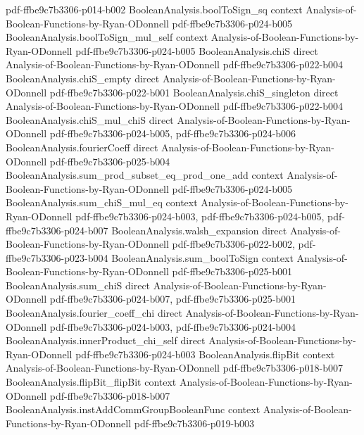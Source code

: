 \begin{theorem}
  {pdf-ffbe9c7b3306-p014-b002}
\proofstep
  {BooleanAnalysis.boolToSign_sq}
  {context}
  {Analysis-of-Boolean-Functions-by-Ryan-ODonnell}
  {pdf-ffbe9c7b3306-p024-b005}
\proofstep
  {BooleanAnalysis.boolToSign_mul_self}
  {context}
  {Analysis-of-Boolean-Functions-by-Ryan-ODonnell}
  {pdf-ffbe9c7b3306-p024-b005}
\proofstep
  {BooleanAnalysis.chiS}
  {direct}
  {Analysis-of-Boolean-Functions-by-Ryan-ODonnell}
  {pdf-ffbe9c7b3306-p022-b004}
\proofstep
  {BooleanAnalysis.chiS_empty}
  {direct}
  {Analysis-of-Boolean-Functions-by-Ryan-ODonnell}
  {pdf-ffbe9c7b3306-p022-b001}
\proofstep
  {BooleanAnalysis.chiS_singleton}
  {direct}
  {Analysis-of-Boolean-Functions-by-Ryan-ODonnell}
  {pdf-ffbe9c7b3306-p022-b004}
\proofstep
  {BooleanAnalysis.chiS_mul_chiS}
  {direct}
  {Analysis-of-Boolean-Functions-by-Ryan-ODonnell}
  {pdf-ffbe9c7b3306-p024-b005,
    pdf-ffbe9c7b3306-p024-b006}
\proofstep
  {BooleanAnalysis.fourierCoeff}
  {direct}
  {Analysis-of-Boolean-Functions-by-Ryan-ODonnell}
  {pdf-ffbe9c7b3306-p025-b004}
\proofstep
  {BooleanAnalysis.sum_prod_subset_eq_prod_one_add}
  {context}
  {Analysis-of-Boolean-Functions-by-Ryan-ODonnell}
  {pdf-ffbe9c7b3306-p024-b005}
\proofstep
  {BooleanAnalysis.sum_chiS_mul_eq}
  {context}
  {Analysis-of-Boolean-Functions-by-Ryan-ODonnell}
  {pdf-ffbe9c7b3306-p024-b003,
    pdf-ffbe9c7b3306-p024-b005,
    pdf-ffbe9c7b3306-p024-b007}
\proofstep
  {BooleanAnalysis.walsh_expansion}
  {direct}
  {Analysis-of-Boolean-Functions-by-Ryan-ODonnell}
  {pdf-ffbe9c7b3306-p022-b002,
    pdf-ffbe9c7b3306-p023-b004}
\proofstep
  {BooleanAnalysis.sum_boolToSign}
  {context}
  {Analysis-of-Boolean-Functions-by-Ryan-ODonnell}
  {pdf-ffbe9c7b3306-p025-b001}
\proofstep
  {BooleanAnalysis.sum_chiS}
  {direct}
  {Analysis-of-Boolean-Functions-by-Ryan-ODonnell}
  {pdf-ffbe9c7b3306-p024-b007,
    pdf-ffbe9c7b3306-p025-b001}
\proofstep
  {BooleanAnalysis.fourier_coeff_chi}
  {direct}
  {Analysis-of-Boolean-Functions-by-Ryan-ODonnell}
  {pdf-ffbe9c7b3306-p024-b003,
    pdf-ffbe9c7b3306-p024-b004}
\proofstep
  {BooleanAnalysis.innerProduct_chi_self}
  {direct}
  {Analysis-of-Boolean-Functions-by-Ryan-ODonnell}
  {pdf-ffbe9c7b3306-p024-b003}
\proofstep
  {BooleanAnalysis.flipBit}
  {context}
  {Analysis-of-Boolean-Functions-by-Ryan-ODonnell}
  {pdf-ffbe9c7b3306-p018-b007}
\proofstep
  {BooleanAnalysis.flipBit_flipBit}
  {context}
  {Analysis-of-Boolean-Functions-by-Ryan-ODonnell}
  {pdf-ffbe9c7b3306-p018-b007}
\proofstep
  {BooleanAnalysis.instAddCommGroupBooleanFunc}
  {context}
  {Analysis-of-Boolean-Functions-by-Ryan-ODonnell}
  {pdf-ffbe9c7b3306-p019-b003}

\end{theorem}
